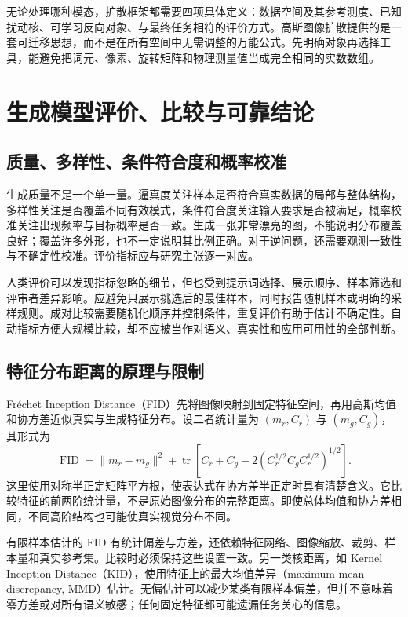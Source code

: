 \documentclass[UTF8,12pt,a4paper,fontset=fandol]{ctexart}
\begin{document}
无论处理哪种模态，扩散框架都需要四项具体定义：数据空间及其参考测度、已知扰动核、可学习反向对象、与最终任务相符的评价方式。高斯图像扩散提供的是一套可迁移思想，而不是在所有空间中无需调整的万能公式。先明确对象再选择工具，能避免把词元、像素、旋转矩阵和物理测量值当成完全相同的实数数组。

\section{生成模型评价、比较与可靠结论}
\label{sec:diff-evaluation}
\subsection{质量、多样性、条件符合度和概率校准}
生成质量不是一个单一量。逼真度关注样本是否符合真实数据的局部与整体结构，多样性关注是否覆盖不同有效模式，条件符合度关注输入要求是否被满足，概率校准关注出现频率与目标概率是否一致。生成一张非常漂亮的图，不能说明分布覆盖良好；覆盖许多外形，也不一定说明其比例正确。对于逆问题，还需要观测一致性与不确定性校准。评价指标应与研究主张逐一对应。

人类评价可以发现指标忽略的细节，但也受到提示词选择、展示顺序、样本筛选和评审者差异影响。应避免只展示挑选后的最佳样本，同时报告随机样本或明确的采样规则。成对比较需要随机化顺序并控制条件，重复评价有助于估计不确定性。自动指标方便大规模比较，却不应被当作对语义、真实性和应用可用性的全部判断。

\subsection{特征分布距离的原理与限制}
Fr\'{e}chet Inception Distance（FID）先将图像映射到固定特征空间，再用高斯均值和协方差近似真实与生成特征分布\cite{heusel2017}。设二者统计量为 $(m_r,C_r)$ 与 $(m_g,C_g)$，其形式为
\begin{equation}
 \operatorname{FID}=\|m_r-m_g\|^2+
 \operatorname{tr}\!\left[C_r+C_g-2(C_r^{1/2}C_gC_r^{1/2})^{1/2}\right].
 \label{eq:diff-fid}
\end{equation}
这里使用对称半正定矩阵平方根，使表达式在协方差半正定时具有清楚含义。它比较特征的前两阶统计量，不是原始图像分布的完整距离。即使总体均值和协方差相同，不同高阶结构也可能使真实视觉分布不同。

有限样本估计的 FID 有统计偏差与方差，还依赖特征网络、图像缩放、裁剪、样本量和真实参考集。比较时必须保持这些设置一致。另一类核距离，如 Kernel Inception Distance（KID），使用特征上的最大均值差异（maximum mean discrepancy, MMD）估计\cite{binkowski2018}。无偏估计可以减少某类有限样本偏差，但并不意味着零方差或对所有语义敏感；任何固定特征都可能遗漏任务关心的信息。
\end{document}
